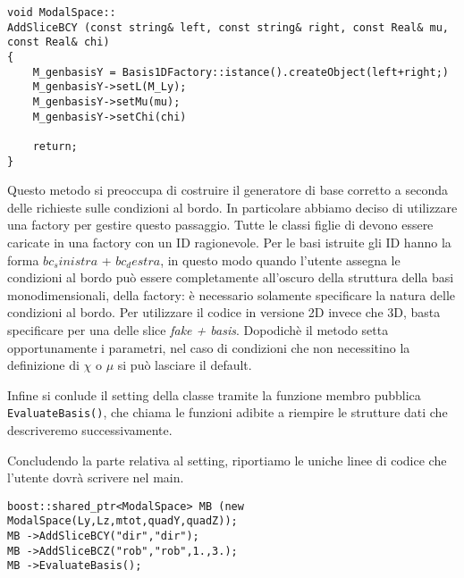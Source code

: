 \begin{lstlisting}[style = general]
void ModalSpace::
AddSliceBCY (const string& left, const string& right, const Real& mu, const Real& chi)
{
	M_genbasisY = Basis1DFactory::istance().createObject(left+right;)
	M_genbasisY->setL(M_Ly);
	M_genbasisY->setMu(mu);
	M_genbasisY->setChi(chi)
	
	return;
}
\end{lstlisting}
Questo metodo si preoccupa di costruire il generatore di base corretto a seconda delle richieste sulle condizioni al bordo.
In particolare abbiamo deciso di utilizzare una factory per gestire questo passaggio.
Tutte le classi figlie di  devono essere caricate in una factory con un ID ragionevole.
Per le basi istruite gli ID hanno la forma $bc_sinistra$ + $bc_destra$, in questo modo
quando l'utente assegna le condizioni al bordo pu\`o essere completamente all'oscuro della struttura della basi monodimensionali,
della factory: \`e necessario solamente specificare la natura delle condizioni al bordo. Per utilizzare
il codice in versione 2D invece che 3D, basta specificare per una delle slice \emph{fake + basis}.
Dopodich\`e il metodo setta opportunamente i parametri, nel caso di condizioni che non necessitino la definizione di $\chi$ o $\mu$
si pu\`o lasciare il default.

Infine si conlude il setting della classe  tramite la funzione membro pubblica \texttt{EvaluateBasis()}, 
che chiama le funzioni adibite a riempire le strutture dati che descriveremo successivamente.

Concludendo la parte relativa al setting, riportiamo le uniche linee di codice che l'utente dovr\`a scrivere nel 
main.
\begin{lstlisting}[style = general]
boost::shared_ptr<ModalSpace> MB (new ModalSpace(Ly,Lz,mtot,quadY,quadZ));
MB ->AddSliceBCY("dir","dir");
MB ->AddSliceBCZ("rob","rob",1.,3.);
MB ->EvaluateBasis();
\end{lstlisting}

